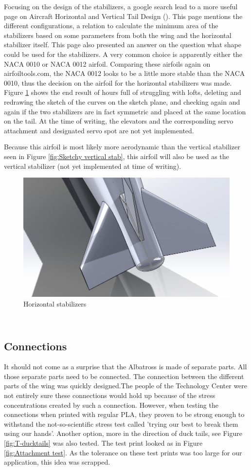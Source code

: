 Focusing on the design of the stabilizers, a google search lead to a more useful page on Aircraft Horizontal and Vertical Tail Design (\cite{Stablizers}). This page mentions the different configurations, a relation to calculate the minimum area of the stabilizers based on some parameters from both the wing and the horizontal stabilizer itself. This page also presented an answer on the question what shape could be used for the stabilizers. A very common choice is apparently either the NACA 0010 or NACA 0012 airfoil. Comparing these airfoils again on airfoiltools.com, the NACA 0012 looks to be a little more stable than the NACA 0010, thus the decision on the airfoil for the horizontal stabilizers was made. Figure \ref{fig:Horizontal stab} shows the end result of hours full of struggling with lofts, deleting and redrawing the sketch of the curves on the sketch plane, and checking again and again if the two stabilizers are in fact symmetric and placed at the same location on the tail. At the time of writing, the elevators and the corresponding servo attachment and designated servo spot are not yet implemented.

Because this airfoil is most likely more aerodynamic than the vertical stabilizer seen in Figure \ref{fig:Sketchy vertical stab}, this airfoil will also be used as the vertical stabilizer (not yet implemented at time of writing).

\begin{figure}
    \centering
    \includegraphics[width=0.5\linewidth]{images/Horizonal stab.png}
    \caption{Horizontal stabilizers}
    \label{fig:Horizontal stab}
\end{figure}\\

\subsection{Connections}
It should not come as a surprise that the Albatross is made of separate parts. All those separate parts need to be connected. The connection between the different parts of the wing was quickly designed.The people of the Technology Center were not entirely sure these connections would hold up because of the stress concentrations created by such a connection. However, when testing the connections when printed with regular PLA, they proven to be strong enough to withstand the not-so-scientific stress test called 'trying our best to break them using our hands'. Another option, more in the direction of duck tails, see Figure \ref{fig:T-ducktails} was also tested. The test print looked as in Figure \ref{fig:Attachment test}. As the tolerance on these test prints was too large for our application, this idea was scrapped. 

